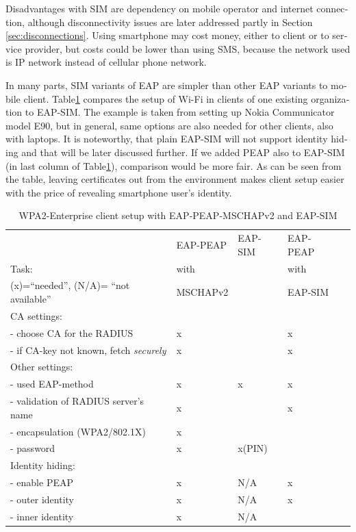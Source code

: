 \documentclass[12pt,a4paper,english]{tutthesis}
\begin{document}
\begin{otherlanguage}{english}
Disadvantages with SIM are dependency on mobile operator and internet
connection, although disconnectivity issues are later addressed
partly in Section \ref{sec:disconnections}.
Using smartphone may cost money, either to client or to service
provider, but costs could be lower than using SMS, because 
the network  used is IP network instead of cellular phone network.

In many parts, SIM variants of EAP are simpler than other EAP
variants to mobile client.  Table\ref{table-peapsim} compares the setup of Wi-Fi
in clients of one existing organization to EAP-SIM. The example 
is taken from setting up Nokia Communicator model E90, but in general,
same options are also needed for other clients, also with laptops. It
is noteworthy, that plain EAP-SIM will not support identity hiding and
that will be later discussed further. If we added PEAP
also to EAP-SIM (in last column of Table\ref{table-peapsim}), comparison would be more fair.
As can be seen from the table, leaving certificates out from the environment
makes client setup easier with the price of revealing smartphone user's
identity.  



\begin{table}[htb]
\caption{\label{table-peapsim}WPA2-Enterprise client setup with EAP-PEAP-MSCHAPv2 and EAP-SIM}
\centering
\begin{tabular}{|l|l|l|ll|}
\hline
 & EAP-PEAP & EAP-SIM & EAP-PEAP & \\
Task: & with &  & with & \\
(x)=``needed'', (N/A)= ``not available'' & MSCHAPv2 &  & EAP-SIM & \\
\hline
CA settings: &  &  &  & \\
- choose CA for the RADIUS & x &  & x & \\
- if CA-key not known, fetch \emph{securely} & x &  & x & \\
\hline
Other settings: &  &  &  & \\
- used EAP-method & x & x & x & \\
- validation of RADIUS server's name & x &  & x & \\
- encapsulation (WPA2/802.1X) & x &  &  & \\
- password & x & x(PIN) &  & \\
\hline
Identity hiding: &  &  &  & \\
- enable PEAP & x & N/A & x & \\
- outer identity & x & N/A & x & \\
- inner identity & x & N/A &  & \\
\hline
\end{tabular}
\end{table}


\end{otherlanguage}
\end{document}
